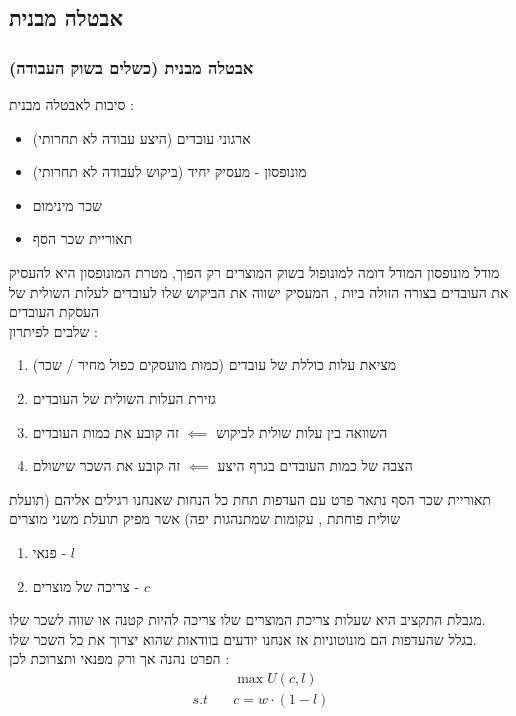 \documentclass{beamer}
\begin{document}
\begin{RTL}
\section{אבטלה מבנית}
\begin{frame}[allowframebreaks]
    \frametitle{אבטלה מבנית (כשלים בשוק העבודה)}
    סיבות לאבטלה מבנית : 
    \begin{itemize}
        \item ארגוני עובדים (היצע עבודה לא תחרותי)
        \item מונופסון - מעסיק יחיד (ביקוש לעבודה לא תחרותי)
        \item שכר מינימום
        \item תאוריית שכר הסף
    \end{itemize}

    \framebreak
    \begin{block}{מודל מונופסון}
        המודל דומה למונופול בשוק המוצרים רק הפוך, מטרת המונופסון היא להעסיק את העובדים בצורה הזולה ביות , המעסיק ישווה את הביקוש שלו לעובדים לעלות השולית של העסקת העובדים \\
        שלבים לפיתרון :
        \begin{enumerate}
            \item מציאת עלות כוללת של עובדים (כמות מועסקים כפול מחיר / שכר)
            \item גזירת העלות השולית של העובדים
            \item השוואה בין עלות שולית לביקוש $\impliedby$ זה קובע את כמות העובדים
            \item הצבה של כמות העובדים בגרף היצע $\impliedby$ זה קובע את השכר שישולם
        \end{enumerate}
    \end{block}

    \framebreak

    \begin{block}{תאוריית שכר הסף}
        נתאר פרט עם העדפות תחת כל הנחות שאנחנו רגילים אליהם (תועלת שולית פוחתת , עקומות שמתנהגות יפה) אשר מפיק תועלת משני מוצרים
        \begin{enumerate}
            \item פנאי - $l$
            \item צריכה של מוצרים - $c$
        \end{enumerate}
        מגבלת התקציב היא שעלות צריכת המוצרים שלו צריכה להיות קטנה או שווה לשכר שלו. \\
        בגלל שהעדפות הם מונוטוניות אז אנחנו יודעים בוודאות שהוא יצרוך את כל השכר שלו. \\
        הפרט נהנה אך ורק מפנאי ותצרוכת לכן :
        \begin{align*}
        &\max U(c,l) \\
        s.t \quad &c = w \cdot (1 - l)
      \end{align*}
    \end{block}


\end{frame}
\end{RTL}
\end{document}

